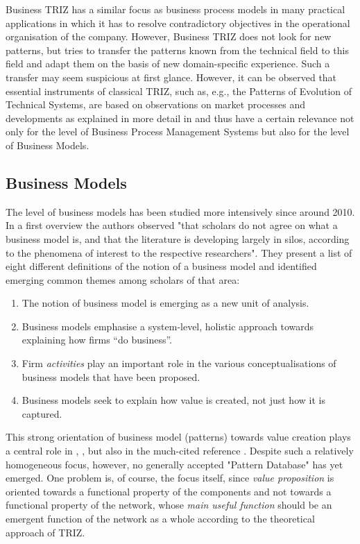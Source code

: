 \documentclass[11pt,a4paper]{article}
\begin{document}
Business TRIZ has a similar focus as business process models in many practical
applications in which it has to resolve contradictory objectives in the
operational organisation of the company. However, Business TRIZ does not look
for new patterns, but tries to transfer the patterns known from the technical
field to this field and adapt them on the basis of new domain-specific
experience. Such a transfer may seem suspicious at first glance.  However, it
can be observed that essential instruments of classical TRIZ, such as, e.g.,
the Patterns of Evolution of Technical Systems, are based on observations on
market processes and developments as explained in more detail in
\cite{Graebe2020} and thus have a certain relevance not only for the level of
Business Process Management Systems but also for the level of Business Models.

\subsection{Business Models}

The level of business models has been studied more intensively since around
2010. In a first overview \cite{Zott2011} the authors observed "that scholars
do not agree on what a business model is, and that the literature is
developing largely in silos, according to the phenomena of interest to the
respective researchers". They present a list of eight different definitions of
the notion of a business model and identified emerging common themes among
scholars of that area:
\begin{enumerate}
\item The notion of business model is emerging as a new unit of analysis.
\item Business models emphasise a system-level, holistic approach towards
  explaining how firms “do business”.
\item Firm \emph{activities} play an important role in the various
  conceptualisations of business models that have been proposed.
\item Business models seek to explain how value is created, not just how it is
  captured. 
\end{enumerate}

This strong orientation of business model (patterns) towards value creation
plays a central role in \cite{Remane2019}, \cite{Zott2011}, but also in the
much-cited reference \cite{Gassmann2014}. Despite such a relatively
homogeneous focus, however, no generally accepted "Pattern Database" has yet
emerged.  One problem is, of course, the focus itself, since \emph{value
  proposition} is oriented towards a functional property of the components and
not towards a functional property of the network, whose \emph{main useful
  function} should be an emergent function of the network as a whole according
to the theoretical approach of TRIZ.
\end{document}
